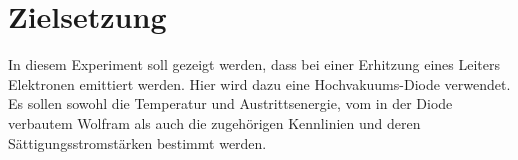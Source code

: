 
\section{Zielsetzung}
\label{sec:Zielsetzung}
 In diesem Experiment soll gezeigt werden, dass bei einer Erhitzung eines Leiters Elektronen emittiert werden. Hier wird dazu eine Hochvakuums-Diode verwendet. Es sollen sowohl die Temperatur und Austrittsenergie, vom in der Diode verbautem Wolfram als auch die zugehörigen Kennlinien und deren Sättigungsstromstärken bestimmt werden.